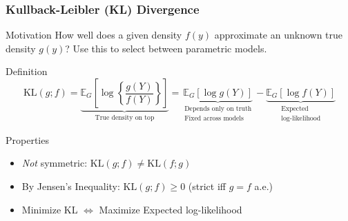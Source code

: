 \begin{frame}
  \frametitle{Kullback-Leibler (KL) Divergence}

  \begin{block}{Motivation}
    How well does a given density $f(y)$ approximate an unknown true density $g(y)$? Use this to select between parametric models.
  \end{block}

  \pause

  \begin{alertblock}{Definition}
    \vspace{-3em}
  \[
    \text{KL}(g;f) = \underbrace{\mathbb{E}_G \left[ \log\left\{ \frac{g(Y)}{f(Y)} \right\}\right]}_{\text{True density on top}} 
    = \underbrace{\mathbb{E}_G\left[ \log g(Y) \right]}_{\substack{\text{Depends only on truth} \\ \text{Fixed across models}}} - \underbrace{\mathbb{E}_G \left[ \log f(Y) \right]}_{\substack{\text{Expected} \\ \text{log-likelihood}}}
  \]
\end{alertblock}

\vspace{-2.5em}

\pause

\begin{block}{Properties}
  \begin{itemize}
    \item \emph{Not} symmetric: $\text{KL}(g;f) \neq \text{KL}(f;g)$
    \item By Jensen's Inequality: $\text{KL}(g;f) \geq 0$ (strict iff $g=f$ a.e.)
    \item Minimize KL $\iff$ Maximize Expected log-likelihood
  \end{itemize}

\end{block}

\end{frame}

